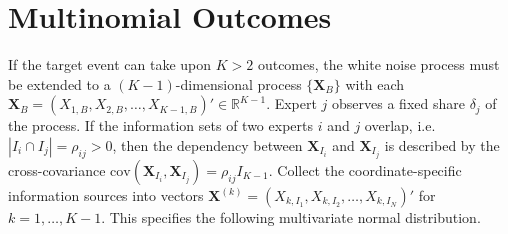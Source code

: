 \documentclass[11pt,twoside]{article}
\theoremstyle{definition}
\theoremstyle{definition}
\begin{document}
%


%


\section{Multinomial Outcomes}
If the target event can take upon $K > 2$ outcomes, the white noise process must be extended to a $(K-1)$-dimensional process $\{ \boldsymbol{X}_B \}$ with each $\boldsymbol{X}_B = (X_{1,B}, X_{2,B},  \dots, X_{K-1,B})' \in \mathbb{R}^{K-1}$.  Expert $j$ observes a fixed share $\delta_j$ of the process. If the information sets of two experts $i$ and $j$ overlap, i.e. $| I_i \cap I_j| = \rho_{ij} > 0$, then the dependency between $\boldsymbol{X}_{I_i}$ and $\boldsymbol{X}_{I_j}$ is described by the cross-covariance $\text{cov}(\boldsymbol{X}_{I_i}, \boldsymbol{X}_{I_j}) = \rho_{ij} I_{K-1}$. Collect the coordinate-specific information sources into vectors $\boldsymbol{X}^{(k)} = \left(X_{k,I_1}, X_{k,I_2}, \dots, X_{k,I_N} \right)'$  for $k = 1, \dots, K-1$. This specifies the following multivariate normal distribution. 
\end{document}
